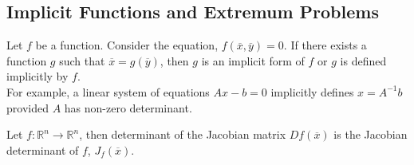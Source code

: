 \subsection{Implicit Functions and Extremum Problems}
\begin{definition}
	Let $f$ be a function.
	Consider the equation, $f(\overline{x},\overline{y}) = 0$.
	If there exists a function $g$ such that $\overline{x} = g(\overline{y})$, then $g$ is an implicit form of $f$ or $g$ is defined implicitly by $f$.\\

	For example, a linear system of equations $Ax-b = 0$ implicitly defines $x = A^{-1}b$ provided $ A$ has non-zero determinant.
\end{definition}

\begin{definition}
	Let $f : \mathbb{R}^n \to \mathbb{R}^n$, then determinant of the Jacobian matrix $Df(\overline{x})$ is the Jacobian determinant of $f$, $J_f(\overline{x})$.
\end{definition}

